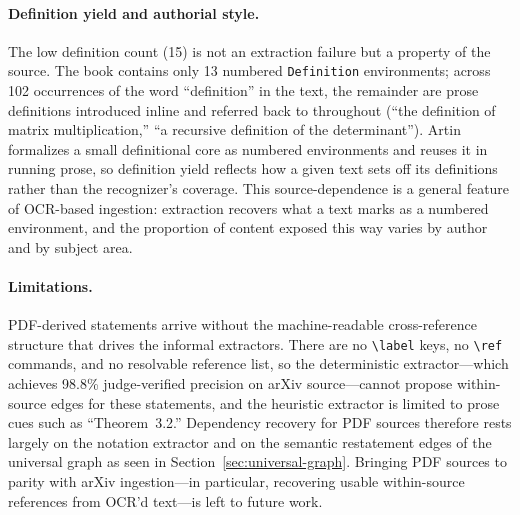 \paragraph{Definition yield and authorial style.}
The low definition count (15) is not an extraction failure but a property of the source. The book contains only 13 numbered \texttt{Definition} environments; across 102 occurrences of the word ``definition'' in the text, the remainder are prose definitions introduced inline and referred back to throughout (``the definition of matrix multiplication,'' ``a recursive definition of the determinant''). Artin formalizes a small definitional core as numbered environments and reuses it in running prose, so definition yield reflects how a given text sets off its definitions rather than the recognizer's coverage. This source-dependence is a general feature of OCR-based ingestion: extraction recovers what a text marks as a numbered environment, and the proportion of content exposed this way varies by author and by subject area.

\paragraph{Limitations.}
PDF-derived statements arrive without the machine-readable cross-reference structure that drives the informal extractors. There are no \verb|\label| keys, no \verb|\ref| commands, and no resolvable reference list, so the deterministic extractor---which achieves 98.8\% judge-verified precision on arXiv source---cannot propose within-source edges for these statements, and the heuristic extractor is limited to prose cues such as ``Theorem~3.2.'' Dependency recovery for PDF sources therefore rests largely on the notation extractor and on the semantic restatement edges of the universal graph as seen in Section~\ref{sec:universal-graph}. Bringing PDF sources to parity with arXiv ingestion---in particular, recovering usable within-source references from OCR'd text---is left to future work.